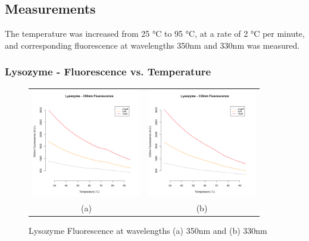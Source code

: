 \documentclass[a4paper,11pt]{article}
\begin{document}
        \subsection*{Measurements}
            The temperature was increased from 25 °C to 95 °C, at a rate of 2 °C per minute,
            and corresponding fluorescence at wavelengths 350nm and 330nm was measured.

            \subsubsection*{Lysozyme - Fluorescence vs. Temperature}
                \begin{figure}[H]
                    \centering
                    \begin{tabular}{cc}
                        \includegraphics[width=180px]{../resources/unfolding_lys_350.png} &
                        \includegraphics[width=180px]{../resources/unfolding_lys_330.png} \\
                        (a) & (b)\\
                    \end{tabular}
                    \caption{Lysozyme Fluorescence at wavelengths (a) 350nm and (b) 330nm}\label{fig:lys_flr}
                \end{figure}
                
\end{document}

